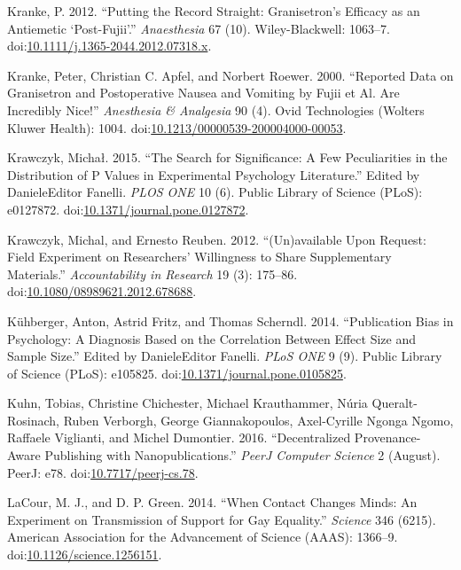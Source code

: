 \documentclass[a5paper]{book}
\begin{document}
\hypertarget{ref-doi:10.1111ux2fj.1365-2044.2012.07318.x}{}
Kranke, P. 2012. ``Putting the Record Straight: Granisetron's Efficacy
as an Antiemetic `Post-Fujii'.'' \emph{Anaesthesia} 67 (10).
Wiley-Blackwell: 1063--7.
doi:\href{https://doi.org/10.1111/j.1365-2044.2012.07318.x}{10.1111/j.1365-2044.2012.07318.x}.

\hypertarget{ref-doi:10.1213ux2f00000539-200004000-00053}{}
Kranke, Peter, Christian C. Apfel, and Norbert Roewer. 2000. ``Reported
Data on Granisetron and Postoperative Nausea and Vomiting by Fujii et
Al. Are Incredibly Nice!'' \emph{Anesthesia \& Analgesia} 90 (4). Ovid
Technologies (Wolters Kluwer Health): 1004.
doi:\href{https://doi.org/10.1213/00000539-200004000-00053}{10.1213/00000539-200004000-00053}.

\hypertarget{ref-doi:10.1371ux2fjournal.pone.0127872}{}
Krawczyk, Michał. 2015. ``The Search for Significance: A Few
Peculiarities in the Distribution of P Values in Experimental Psychology
Literature.'' Edited by DanieleEditor Fanelli. \emph{PLOS ONE} 10 (6).
Public Library of Science (PLoS): e0127872.
doi:\href{https://doi.org/10.1371/journal.pone.0127872}{10.1371/journal.pone.0127872}.

\hypertarget{ref-doi:10.1080ux2f08989621.2012.678688}{}
Krawczyk, Michal, and Ernesto Reuben. 2012. ``(Un)available Upon
Request: Field Experiment on Researchers' Willingness to Share
Supplementary Materials.'' \emph{Accountability in Research} 19 (3):
175--86.
doi:\href{https://doi.org/10.1080/08989621.2012.678688}{10.1080/08989621.2012.678688}.

\hypertarget{ref-doi:10.1371ux2fjournal.pone.0105825}{}
Kühberger, Anton, Astrid Fritz, and Thomas Scherndl. 2014. ``Publication
Bias in Psychology: A Diagnosis Based on the Correlation Between Effect
Size and Sample Size.'' Edited by DanieleEditor Fanelli. \emph{PLoS ONE}
9 (9). Public Library of Science (PLoS): e105825.
doi:\href{https://doi.org/10.1371/journal.pone.0105825}{10.1371/journal.pone.0105825}.

\hypertarget{ref-doi:10.7717ux2fpeerj-cs.78}{}
Kuhn, Tobias, Christine Chichester, Michael Krauthammer, Núria
Queralt-Rosinach, Ruben Verborgh, George Giannakopoulos, Axel-Cyrille
Ngonga Ngomo, Raffaele Viglianti, and Michel Dumontier. 2016.
``Decentralized Provenance-Aware Publishing with Nanopublications.''
\emph{PeerJ Computer Science} 2 (August). PeerJ: e78.
doi:\href{https://doi.org/10.7717/peerj-cs.78}{10.7717/peerj-cs.78}.

\hypertarget{ref-doi:10.1126ux2fscience.1256151}{}
LaCour, M. J., and D. P. Green. 2014. ``When Contact Changes Minds: An
Experiment on Transmission of Support for Gay Equality.'' \emph{Science}
346 (6215). American Association for the Advancement of Science (AAAS):
1366--9.
doi:\href{https://doi.org/10.1126/science.1256151}{10.1126/science.1256151}.
\end{document}

